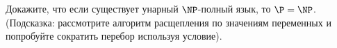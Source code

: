 Докажите, что если существует унарный $\NP$-полный язык, то $\P = \NP$. (Подсказка: рассмотрите алгоритм расщепления по
значениям переменных и попробуйте сократить перебор используя условие).